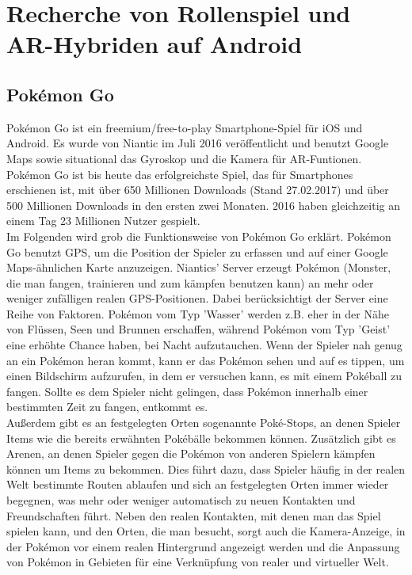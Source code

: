 \documentclass[extern,palatino]{cgBA}
\begin{document}
\section{Recherche von Rollenspiel und AR-Hybriden auf Android}
\subsection{Pokémon Go}
Pokémon Go ist ein freemium/free-to-play Smartphone-Spiel für iOS und Android. Es wurde von Niantic im Juli 2016 veröffentlicht und benutzt Google Maps sowie situational das Gyroskop und die Kamera für AR-Funtionen. %
\\Pokémon Go ist bis heute das erfolgreichste Spiel, das für Smartphones erschienen ist, mit über 650 Millionen Downloads (Stand 27.02.2017) und über 500 Millionen Downloads in den ersten zwei  Monaten.%
2016 haben gleichzeitig an einem Tag 23 Millionen Nutzer gespielt.
\\
Im Folgenden wird grob die Funktionsweise von Pokémon Go erklärt. Pokémon Go benutzt GPS, um die Position der Spieler zu erfassen und auf einer Google Maps-ähnlichen Karte anzuzeigen. %
Niantics' Server erzeugt Pokémon (Monster, die man fangen, trainieren und zum kämpfen benutzen kann) an mehr oder weniger zufälligen realen GPS-Positionen. Dabei berücksichtigt der Server eine Reihe von Faktoren. Pokémon vom Typ 'Wasser' werden z.B. eher in der Nähe von Flüssen, Seen und Brunnen erschaffen, während Pokémon vom Typ 'Geist' eine erhöhte Chance haben, bei Nacht aufzutauchen. Wenn der Spieler nah genug an ein Pokémon heran kommt, kann er das Pokémon sehen und auf es tippen, um einen Bildschirm aufzurufen, in dem er versuchen kann, es mit einem Pokéball zu fangen. Sollte es dem Spieler nicht gelingen, dass Pokémon innerhalb einer bestimmten Zeit zu fangen, entkommt es.
\\Außerdem gibt es an festgelegten Orten sogenannte Poké-Stops, an denen Spieler Items wie die bereits erwähnten Pokébälle bekommen können. Zusätzlich gibt es Arenen, an denen Spieler gegen die Pokémon von anderen Spielern kämpfen können um Items zu bekommen. Dies führt dazu, dass Spieler häufig in der realen Welt bestimmte Routen ablaufen und sich an festgelegten Orten immer wieder begegnen, was mehr oder weniger automatisch zu neuen Kontakten und Freundschaften führt. Neben den realen Kontakten, mit denen man das Spiel spielen kann, und den Orten, die man besucht, sorgt auch die Kamera-Anzeige, in der Pokémon vor einem realen Hintergrund angezeigt werden und die Anpassung von Pokémon in Gebieten für eine Verknüpfung von realer und virtueller Welt. 
\end{document}
